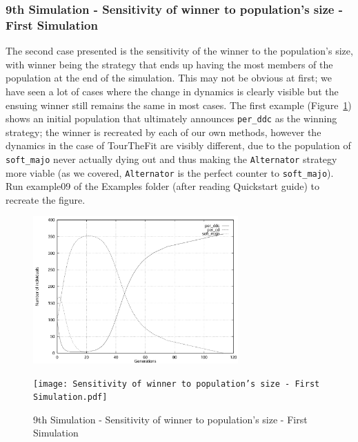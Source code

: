 \subsubsection{9th Simulation - Sensitivity of winner to population's size - First Simulation}
The second case presented is the sensitivity of the winner to the population's size, with winner being the strategy that ends up having the most members of the population at the end of the simulation. This may not be obvious at first; we have seen a lot of cases where the change in dynamics is clearly visible but the ensuing winner still remains the same in most cases. The first example (Figure~\ref{fig:Sensitivity of winner to population's size - First Simulation}) shows an initial population that ultimately announces \texttt{per\_ddc} as the winning strategy; the winner is recreated by each of our own methods, however the dynamics in the case of TourTheFit are visibly different, due to the population of \texttt{soft\_majo} never actually dying out and thus making the \texttt{Alternator} strategy more viable (as we covered, \texttt{Alternator} is the perfect counter to \texttt{soft\_majo}). Run example09 of the Examples folder (after reading Quickstart guide) to recreate the figure.
	\begin{figure}[h]
	    \centering
		\includegraphics[width=0.7\textwidth]{RefPaperFigures/fig8a.jpeg}\par\vspace{0.5em}
	    \texttt{[image: Sensitivity of winner to population's size - First Simulation.pdf]}
	    \caption{9th Simulation - Sensitivity of winner to population's size - First Simulation}
	    \label{fig:Sensitivity of winner to population's size - First Simulation}
	\end{figure}
